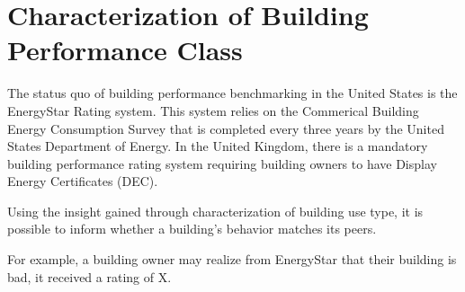 \section{Characterization of Building Performance Class}
\label{sec:results_benchmarking}

The status quo of building performance benchmarking in the United States is the EnergyStar Rating system. This system relies on the Commerical Building Energy Consumption Survey that is completed every three years by the United States Department of Energy. In the United Kingdom, there is a mandatory building performance rating system requiring building owners to have Display Energy Certificates (DEC).

Using the insight gained through characterization of building use type, it is possible to inform whether a building's behavior matches its peers.

For example, a building owner may realize from EnergyStar that their building is bad, it received a rating of X.

